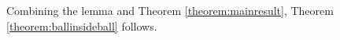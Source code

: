\documentclass[a4paper,11pt]{article}
\theoremstyle{definition}
\theoremstyle{remark}
\newcommand{\ep}{\epsilon}
\begin{document}
Combining the lemma and Theorem \ref{theorem:mainresult}, Theorem \ref{theorem:ballinsideball} follows.






\end{document}
